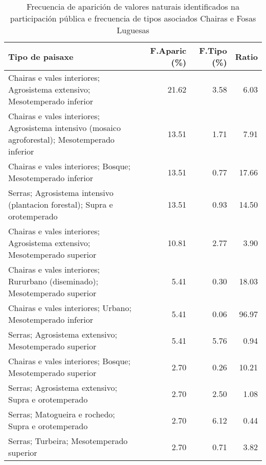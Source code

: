 \begin{table}[p]
\centering
\caption{Frecuencia de aparición de valores naturais identificados na participación pública e frecuencia de tipos asociados Chairas e Fosas Luguesas} 
\label{vsixotnat6}
\begin{tabular}{lrrr}
  \hline
Tipo de paisaxe & F.Aparic (\%) & F.Tipo (\%) & Ratio \\ 
  \hline
Chairas e vales interiores; Agrosistema extensivo; Mesotemperado inferior & 21.62 & 3.58 & 6.03 \\ 
  Chairas e vales interiores; Agrosistema intensivo (mosaico agroforestal); Mesotemperado inferior & 13.51 & 1.71 & 7.91 \\ 
  Chairas e vales interiores; Bosque; Mesotemperado inferior & 13.51 & 0.77 & 17.66 \\ 
  Serras; Agrosistema intensivo (plantacion forestal); Supra e orotemperado & 13.51 & 0.93 & 14.50 \\ 
  Chairas e vales interiores; Agrosistema extensivo; Mesotemperado superior & 10.81 & 2.77 & 3.90 \\ 
  Chairas e vales interiores; Rururbano (diseminado); Mesotemperado superior & 5.41 & 0.30 & 18.03 \\ 
  Chairas e vales interiores; Urbano; Mesotemperado inferior & 5.41 & 0.06 & 96.97 \\ 
  Serras; Agrosistema extensivo; Mesotemperado superior & 5.41 & 5.76 & 0.94 \\ 
  Chairas e vales interiores; Bosque; Mesotemperado superior & 2.70 & 0.26 & 10.21 \\ 
  Serras; Agrosistema extensivo; Supra e orotemperado & 2.70 & 2.50 & 1.08 \\ 
  Serras; Matogueira e rochedo; Supra e orotemperado & 2.70 & 6.12 & 0.44 \\ 
  Serras; Turbeira; Mesotemperado superior & 2.70 & 0.71 & 3.82 \\ 
   \hline
\end{tabular}
\end{table}
